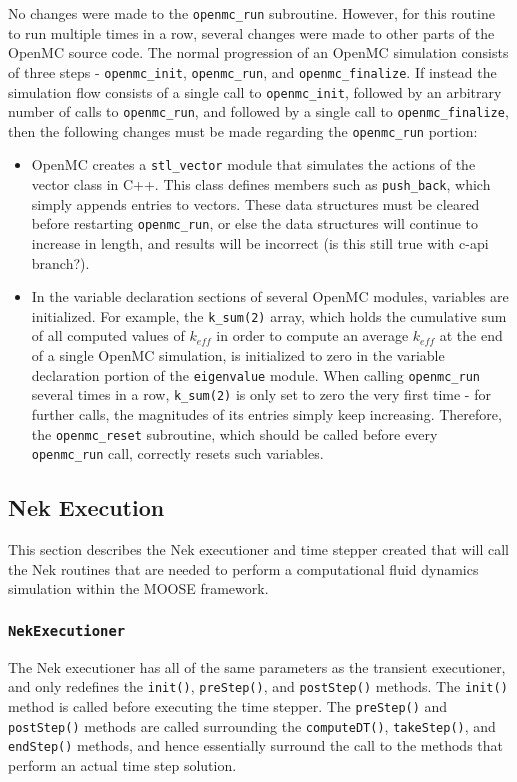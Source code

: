 \documentclass[10pt]{article}
\numberwithin{equation}{section} %
\begin{document}
No changes were made to the {\tt openmc\_run} subroutine. However, for this routine to run multiple times in a row, several changes were made to other parts of the OpenMC source code. The normal progression of an OpenMC simulation consists of three steps - {\tt openmc\_init}, {\tt openmc\_run}, and {\tt openmc\_finalize}. If instead the simulation flow consists of a single call to {\tt openmc\_init}, followed by an arbitrary number of calls to {\tt openmc\_run}, and followed by a single call to {\tt openmc\_finalize}, then the following changes must be made regarding the {\tt openmc\_run} portion:

\begin{itemize}
\item OpenMC creates a {\tt stl\_vector} module that simulates the actions of the vector class in C++. This class defines members such as {\tt push\_back}, which simply appends entries to vectors. These data structures must be cleared before restarting {\tt openmc\_run}, or else the data structures will continue to increase in length, and results will be incorrect (is this still true with c-api branch?).
\item In the variable declaration sections of several OpenMC modules, variables are initialized. For example, the {\tt k\_sum(2)} array, which holds the cumulative sum of all computed values of \(k_{eff}\) in order to compute an average \(k_{eff}\) at the end of a single OpenMC simulation, is initialized to zero in the variable declaration portion of the {\tt eigenvalue} module. When calling {\tt openmc\_run} several times in a row, {\tt k\_sum(2)} is only set to zero the very first time - for further calls, the magnitudes of its entries simply keep increasing. Therefore, the {\tt openmc\_reset} subroutine, which should be called before every {\tt openmc\_run} call, correctly resets such variables. 
\end{itemize}

\subsection{Nek Execution}
This section describes the Nek executioner and time stepper created that will call the Nek routines that are needed to perform a computational fluid dynamics simulation within the MOOSE framework.

\subsubsection{{\tt NekExecutioner}}
The Nek executioner has all of the same parameters as the transient executioner, and only redefines the {\tt init()}, {\tt preStep()}, and {\tt postStep()} methods. The {\tt init()} method is called before executing the time stepper. The {\tt preStep()} and {\tt postStep()} methods are called surrounding the {\tt computeDT()}, {\tt takeStep()}, and {\tt endStep()} methods, and hence essentially surround the call to the methods that perform an actual time step solution.  
\end{document}
